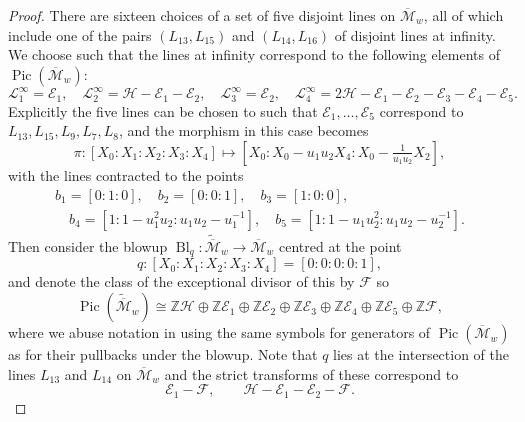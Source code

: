 \documentclass[a4paper,reqno]{amsart}
\numberwithin{equation}{section}
\newcommand{\Z}{\mathbb{Z}}
\newcommand{\p}{\mathbb{P}}
\newcommand{\Pic}{\operatorname{Pic}}
\numberwithin{equation}{section}
\begin{document}
\begin{proof}
    There are sixteen choices of a set of five disjoint lines on $\overline{\mathcal{M}}_w$, all of which include one of the pairs $(L_{13},L_{15})$ and $(L_{14},L_{16})$ of disjoint lines at infinity. 
    We choose such that the lines at infinity correspond to the following elements of $\Pic(\overline{\mathcal{M}}_w)$:
    \begin{equation*}
        \mathcal{L}_{1}^{\infty} = \mathcal{E}_1,\quad 
        \mathcal{L}_{2}^{\infty} = \mathcal{H}-\mathcal{E}_1-\mathcal{E}_2,\quad 
        \mathcal{L}_3^{\infty}=\mathcal{E}_2,\quad 
        \mathcal{L}_4^{\infty} = 2\mathcal{H}-\mathcal{E}_1- \mathcal{E}_2-\mathcal{E}_3- \mathcal{E}_4-\mathcal{E}_5.
    \end{equation*}
    Explicitly the five lines can be chosen to such that $\mathcal{E}_{1},\dots,\mathcal{E}_{5}$ correspond to $L_{13},L_{15},L_{9},L_{7},L_{8}$,
    and the morphism in this case becomes
    \begin{equation*}
            \pi : 
             \left[X_0:X_1:X_2:X_3:X_4\right] \mapsto \left[ X_0  : X_0  - u_1 u_2 X_4 : X_0 - \tfrac{1}{u_1u_2}X_2\right],
    \end{equation*}
    with the lines contracted to the points 
    \begin{gather*}
        b_1 = [0:1:0],\quad b_2 = [0:0:1], \quad b_3 = [1:0:0],\\ \quad b_4 =[1: 1-u_1^2u_2:u_1u_2-u_1^{-1}],\quad b_5 =[1:1-u_1u_2^2:u_1u_2-u_2^{-1}].
    \end{gather*}
    Then consider the blowup $\operatorname{Bl}_q : \widetilde{\overline{\mathcal{M}}}_w \to \overline{\mathcal{M}}_w$ centred at the point 
$$q : [X_0:X_1:X_2:X_3:X_4]=[0:0:0:0:1],
$$
and denote the class of the exceptional divisor of this by $\mathcal{F}$ so 
$$\Pic( \widetilde{\overline{\mathcal{M}}}_w) \cong \Z\mathcal{H}\oplus \Z \mathcal{E}_1\oplus\Z\mathcal{E}_2\oplus \Z \mathcal{E}_3\oplus \Z \mathcal{E}_4\oplus \Z \mathcal{E}_5\oplus \Z \mathcal{F},$$
where we abuse notation in using the same symbols for generators of $\Pic(\overline{\mathcal{M}}_w)$ as for their pullbacks under the blowup.  
Note that $q$ lies at the intersection of the lines $L_{13}$ and $L_{14}$ on $\overline{\mathcal{M}}_w$ and the strict transforms of these correspond to  
$$ \mathcal{E}_1 - \mathcal{F}, \qquad \mathcal{H}-\mathcal{E}_1-\mathcal{E}_2-\mathcal{F}.$$

\end{proof}
\end{document}

